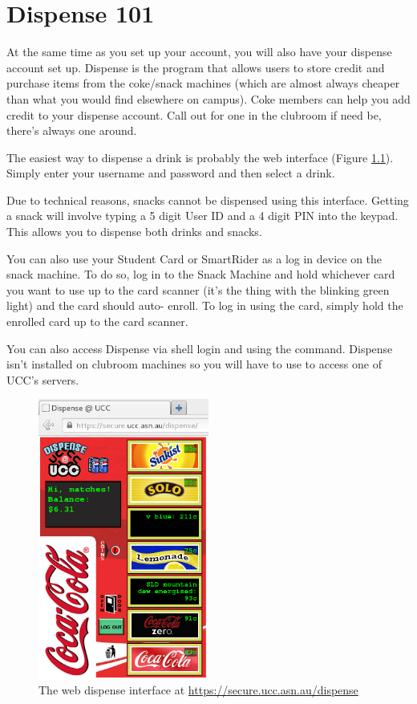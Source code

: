 \chapter{Dispense 101}


At the same time as you set up your account, you will also have your dispense account set up. Dispense is the program that allows users to store credit and purchase items from the coke/snack machines (which are almost always cheaper than what you would find elsewhere on campus). Coke members can help you add credit to your dispense account. Call out for one in the clubroom if need be, there's always one around.


The easiest way to dispense a drink is probably the web interface (Figure \ref{webdispense.png}). Simply enter your username and password and then select a drink. 

Due to technical reasons, snacks cannot be dispensed using this interface. Getting a snack will involve typing a 5 digit User ID and a 4 digit PIN into the keypad. This allows you to dispense both drinks and snacks.

You can also use your Student Card or SmartRider as a log in device on the snack machine. To do so, log in to the Snack Machine and hold whichever card you want to use up to the card scanner (it's the thing with the blinking green light) and the card should auto- enroll. To log in using the card, simply hold the enrolled card up to the card scanner.


You can also access Dispense via shell login and using the  command. Dispense isn't installed on clubroom machines so you will have to use  to access one of UCC's servers.

\begin{figure}[H]
	\centering
	\includegraphics[width=0.5\textwidth]{figures/webdispense.png}
	\caption{The web dispense interface at \url{https://secure.ucc.asn.au/dispense}} 
	\label{webdispense.png}
\end{figure}
